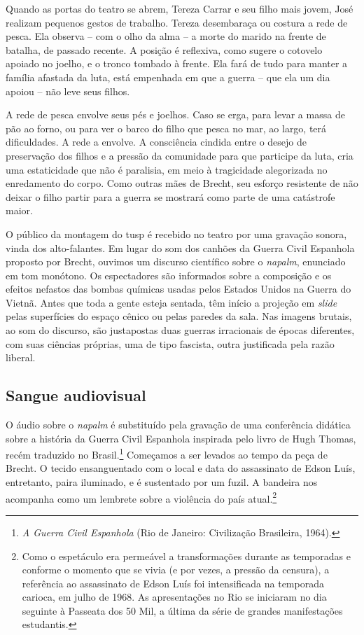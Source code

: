 Quando as portas do teatro se abrem, Tereza Carrar e seu filho mais
jovem, José realizam pequenos gestos de trabalho. Tereza desembaraça ou
costura a rede de pesca. Ela observa -- com o olho da alma -- a morte do
marido na frente de batalha, de passado recente. A posição é reflexiva,
como sugere o cotovelo apoiado no joelho, e o tronco tombado à frente.
Ela fará de tudo para manter a família afastada da luta, está empenhada
em que a guerra -- que ela um dia apoiou -- não leve seus filhos.


A rede de pesca envolve seus pés e joelhos. Caso se erga, para levar a
massa de pão ao forno, ou para ver o barco do filho que pesca no mar, ao
largo, terá dificuldades. A rede a envolve. A consciência cindida entre
o desejo de preservação dos filhos e a pressão da comunidade para que
participe da luta, cria uma estaticidade que não é paralisia, em meio à
tragicidade alegorizada no enredamento do corpo. Como outras mães de
Brecht, seu esforço resistente de não deixar o filho partir para a
guerra se mostrará como parte de uma catástrofe maior.

O público da montagem do {\sc tusp} é recebido no teatro por uma gravação
sonora, vinda dos alto-falantes. Em lugar do som dos canhões da Guerra
Civil Espanhola proposto por Brecht, ouvimos um discurso científico
sobre o {\it napalm}, enunciado em tom monótono. Os espectadores são
informados sobre a composição e os efeitos nefastos das bombas químicas
usadas pelos Estados Unidos na Guerra do Vietnã. Antes que toda a gente
esteja sentada, têm início a projeção em {\it slide} pelas superfícies
do espaço cênico ou pelas paredes da sala. Nas imagens brutais, ao som
do discurso, são justapostas duas guerras irracionais de épocas
diferentes, com suas ciências próprias, uma de tipo fascista, outra
justificada pela razão liberal.

\subsection{Sangue audiovisual}

O áudio sobre o {\it napalm} é substituído pela gravação de uma
conferência didática sobre a história da Guerra Civil Espanhola
inspirada pelo livro de Hugh Thomas, recém traduzido no
Brasil.\footnote{{\it A Guerra Civil Espanhola} (Rio de Janeiro:
  Civilização Brasileira, 1964).} Começamos a ser levados ao tempo da
peça de Brecht. O tecido ensanguentado com o local e data do assassinato
de Edson Luís, entretanto, paira iluminado, e é sustentado por um
fuzil. A bandeira nos acompanha como um lembrete sobre a violência do
país atual.\footnote{Como o espetáculo era permeável a transformações
  durante as temporadas e conforme o momento que se vivia (e por vezes,
  a pressão da censura), a referência ao assassinato de Edson Luís foi
  intensificada na temporada carioca, em julho de 1968. As apresentações
  no Rio se iniciaram no dia seguinte à Passeata dos 50 Mil, a última da
  série de grandes manifestações estudantis.}

